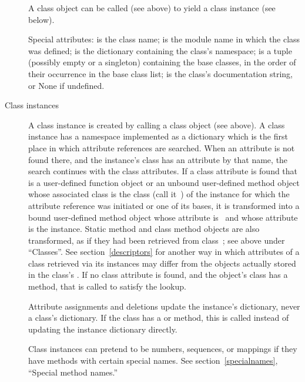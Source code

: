 \begin{description}
A class object can be called (see above) to yield a class instance (see
below).

Special attributes:  is the class name;
 is the module name in which the class was defined;
 is the dictionary containing the class's namespace;
 is a tuple (possibly empty or a singleton)
containing the base classes, in the order of their occurrence in the
base class list;  is the class's documentation string,
or None if undefined.

\item[Class instances]
A class instance is created by calling a class object (see above).
A class instance has a namespace implemented as a dictionary which
is the first place in which
attribute references are searched.  When an attribute is not found
there, and the instance's class has an attribute by that name,
the search continues with the class attributes.  If a class attribute
is found that is a user-defined function object or an unbound
user-defined method object whose associated class is the class
(call it~) of the instance for which the attribute reference
was initiated or one of its bases,
it is transformed into a bound user-defined method object whose
 attribute is~ and whose  attribute
is the instance. Static method and class method objects are also
transformed, as if they had been retrieved from class~;
see above under ``Classes''. See section~\ref{descriptors} for
another way in which attributes of a class retrieved via its
instances may differ from the objects actually stored in the
class's .
If no class attribute is found, and the object's class has a
 method, that is called to satisfy the lookup.

Attribute assignments and deletions update the instance's dictionary,
never a class's dictionary.  If the class has a  or
 method, this is called instead of updating the
instance dictionary directly.

Class instances can pretend to be numbers, sequences, or mappings if
they have methods with certain special names.  See
section~\ref{specialnames}, ``Special method names.''


\end{description}

